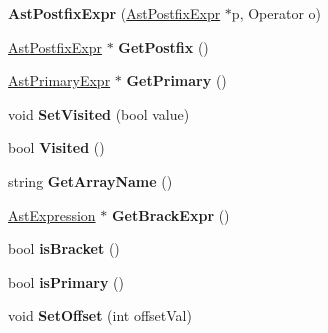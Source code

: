 \begin{DoxyCompactItemize}
\item 
\hypertarget{classAstPostfixExpr_a71f3baa5264259031d95741e65de1e07}{{\bfseries Ast\-Postfix\-Expr} (\hyperlink{classAstPostfixExpr}{Ast\-Postfix\-Expr} $\ast$p, Operator o)}\label{classAstPostfixExpr_a71f3baa5264259031d95741e65de1e07}

\item 
\hypertarget{classAstPostfixExpr_a2cac2396d2ad13b9b9af3832aac846be}{\hyperlink{classAstPostfixExpr}{Ast\-Postfix\-Expr} $\ast$ {\bfseries Get\-Postfix} ()}\label{classAstPostfixExpr_a2cac2396d2ad13b9b9af3832aac846be}

\item 
\hypertarget{classAstPostfixExpr_a646f9aa0e61d183640dc85ea0a07c91c}{\hyperlink{classAstPrimaryExpr}{Ast\-Primary\-Expr} $\ast$ {\bfseries Get\-Primary} ()}\label{classAstPostfixExpr_a646f9aa0e61d183640dc85ea0a07c91c}

\item 
\hypertarget{classAstPostfixExpr_a50dcbfd3bad3f563df90a9ad0b7e7238}{void {\bfseries Set\-Visited} (bool value)}\label{classAstPostfixExpr_a50dcbfd3bad3f563df90a9ad0b7e7238}

\item 
\hypertarget{classAstPostfixExpr_a5b6a44cfff4a5e5b5fd73ee2c308f743}{bool {\bfseries Visited} ()}\label{classAstPostfixExpr_a5b6a44cfff4a5e5b5fd73ee2c308f743}

\item 
\hypertarget{classAstPostfixExpr_ab2a5da9c586a9df484c40abe8144d31d}{string {\bfseries Get\-Array\-Name} ()}\label{classAstPostfixExpr_ab2a5da9c586a9df484c40abe8144d31d}

\item 
\hypertarget{classAstPostfixExpr_a3380286daa3e5312adeab9db059fe8ea}{\hyperlink{classAstExpression}{Ast\-Expression} $\ast$ {\bfseries Get\-Brack\-Expr} ()}\label{classAstPostfixExpr_a3380286daa3e5312adeab9db059fe8ea}

\item 
\hypertarget{classAstPostfixExpr_ab64abc6d0d53ab829374044d929bcf32}{bool {\bfseries is\-Bracket} ()}\label{classAstPostfixExpr_ab64abc6d0d53ab829374044d929bcf32}

\item 
\hypertarget{classAstPostfixExpr_a845e15af7d9d4cadae2732f6ad7e1e0c}{bool {\bfseries is\-Primary} ()}\label{classAstPostfixExpr_a845e15af7d9d4cadae2732f6ad7e1e0c}

\item 
\hypertarget{classAstPostfixExpr_aed796a3e3aa675b56f3418bf20656a45}{void {\bfseries Set\-Offset} (int offset\-Val)}\label{classAstPostfixExpr_aed796a3e3aa675b56f3418bf20656a45}


\end{DoxyCompactItemize}
